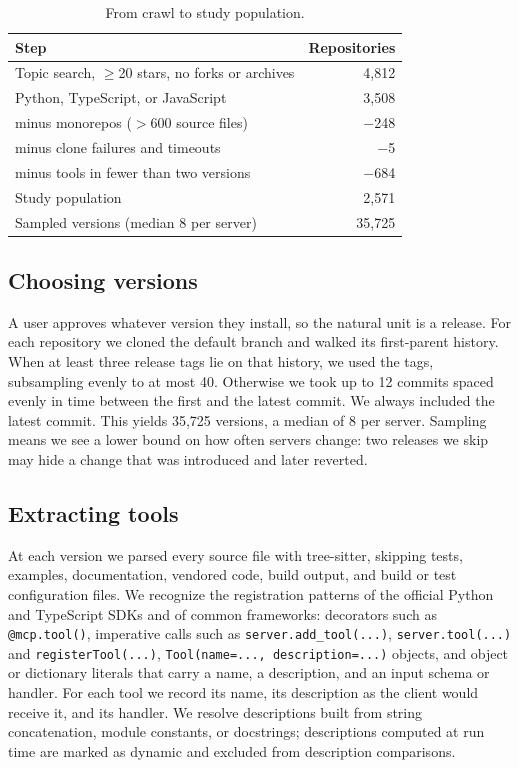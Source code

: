 \begin{table}[t]
\centering\small
\caption{From crawl to study population.}\label{tab:funnel}
\begin{tabular}{lr}
\toprule
Step & Repositories \\
\midrule
Topic search, $\geq$20 stars, no forks or archives & 4,812 \\
Python, TypeScript, or JavaScript & 3,508 \\
\quad minus monorepos ($>$600 source files) & $-$248 \\
\quad minus clone failures and timeouts & $-$5 \\
\quad minus tools in fewer than two versions & $-$684 \\
\midrule
Study population & 2,571 \\
Sampled versions (median 8 per server) & 35,725 \\
\bottomrule
\end{tabular}
\end{table}

\subsection{Choosing versions}\label{sec:versions}
A user approves whatever version they install, so the natural unit is a release. For each repository we cloned the default branch and walked its first-parent history. When at least three release tags lie on that history, we used the tags, subsampling evenly to at most 40. Otherwise we took up to 12 commits spaced evenly in time between the first and the latest commit. We always included the latest commit. This yields 35,725 versions, a median of 8 per server. Sampling means we see a lower bound on how often servers change: two releases we skip may hide a change that was introduced and later reverted.

\subsection{Extracting tools}\label{sec:tools}
At each version we parsed every source file with tree-sitter, skipping tests, examples, documentation, vendored code, build output, and build or test configuration files. We recognize the registration patterns of the official Python and TypeScript SDKs and of common frameworks: decorators such as \texttt{@mcp.tool()}, imperative calls such as \texttt{server.add\_tool(...)}, \texttt{server.tool(...)} and \texttt{registerTool(...)}, \texttt{Tool(name=..., description=...)} objects, and object or dictionary literals that carry a name, a description, and an input schema or handler. For each tool we record its name, its description as the client would receive it, and its handler. We resolve descriptions built from string concatenation, module constants, or docstrings; descriptions computed at run time are marked as dynamic and excluded from description comparisons.

